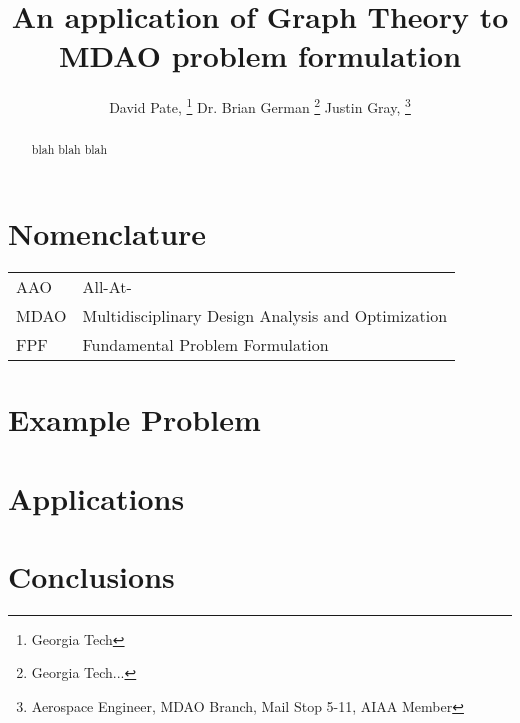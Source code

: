 \documentclass[]{aiaa-tc} %
\title{An application of Graph Theory to MDAO problem formulation}
\author{
  David Pate, %
     \thanks{Georgia Tech}
  Dr. Brian German 
     \thanks{Georgia Tech...}
  Justin Gray,%
     \thanks{Aerospace Engineer, MDAO Branch, Mail Stop 5-11, AIAA Member}   
 }
\begin{document}
\maketitle
 
\begin{abstract}
   blah blah blah
\end{abstract}

\section*{Nomenclature}

\begin{tabular}{l l} 
    AAO      & All-At- \\
    MDAO     & Multidisciplinary Design Analysis and Optimization \\
    FPF      & Fundamental Problem Formulation \\
\end{tabular}





    
\section{Example Problem}

\section{Applications}

\section{Conclusions}


\end{document}
